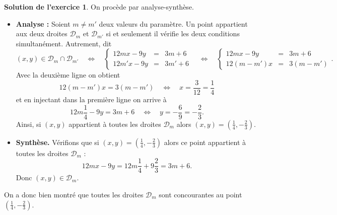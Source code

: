 \documentclass[a4paper, 11pt,openany]{article}%
\theoremstyle{plain}
\theoremstyle{definition}
\newtheorem{sol}{Solution de l'exercice}
\theoremstyle{remark}
\begin{document}
\begin{sol}
On procède par analyse-synthèse.
\begin{itemize}
\item \textbf{Analyse :} Soient $m \neq m'$ deux valeurs du paramètre. Un point appartient aux deux droites $\mathcal{D}_m$ et $\mathcal{D}_{m'}$ si et seulement il vérifie les deux conditions simultanément. Autrement, dit
\[(x,y) \in \mathcal{D}_m \cap \mathcal{D}_{m'} \quad \Leftrightarrow \quad  \left\{
    \begin{array}{ccl}
        12mx-9y & = & 3m +6 \\
       12m'x-9y & = & 3m' +6 
    \end{array}
\right. \quad \Leftrightarrow \quad  \left\{
    \begin{array}{ccl}
        12mx-9y & = & 3m +6 \\
       12(m-m')x & = & 3 (m-m')
    \end{array}
\right..\]
Avec la deuxième ligne on obtient
\[12(m-m')x = 3 (m-m') \quad \Leftrightarrow \quad x = \frac{3}{12} = \frac{1}{4}\]
et en injectant dans la première ligne on arrive à
\[ 12m \frac{1}{4} - 9y = 3m + 6 \quad \Leftrightarrow \quad y = -\frac{6}{9} = -\frac{2}{3}.\]
Ainsi, si $(x,y)$ appartient à toutes les droites $\mathcal{D}_m$ alors $(x,y) = \left( \frac{1}{4} , -\frac{2}{3} \right)$.
\item \textbf{Synthèse.} Vérifions que si $(x,y) = \left( \frac{1}{4} , -\frac{2}{3} \right)$ alors ce point appartient à toutes les droites $\mathcal{D}_m$ :
\[ 12mx-9y  = 12 m \frac{1}{4} + 9 \frac{2}{3} = 3m +6.\]
Donc $(x,y) \in \mathcal{D}_m$.
\end{itemize}
On a donc bien montré que toutes les droites $\mathcal{D}_m$ sont concourantes au point $ \left( \frac{1}{4} , -\frac{2}{3} \right)$.
\end{sol}
\end{document}
